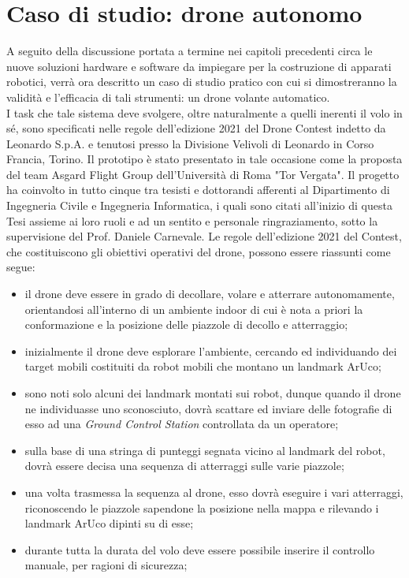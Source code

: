 
\chapter[Caso di studio: drone autonomo]{Caso di studio: drone autonomo}
\label{chap:Chapter3}
\doublespacing
\fontsize{12}{12}\selectfont
\indent A seguito della discussione portata a termine nei capitoli precedenti circa le nuove soluzioni hardware e software da impiegare per la costruzione di apparati robotici, verrà ora descritto un caso di studio pratico con cui si dimostreranno la validità e l'efficacia di tali strumenti: un drone volante automatico.\\
I task che tale sistema deve svolgere, oltre naturalmente a quelli inerenti il volo in sé, sono specificati nelle regole dell'edizione 2021 del Drone Contest indetto da Leonardo S.p.A. e tenutosi presso la Divisione Velivoli di Leonardo in Corso Francia, Torino. Il prototipo è stato presentato in tale occasione come la proposta del team Asgard Flight Group dell'Università di Roma "Tor Vergata". Il progetto ha coinvolto in tutto cinque tra tesisti e dottorandi afferenti al Dipartimento di Ingegneria Civile e Ingegneria Informatica, i quali sono citati all'inizio di questa Tesi assieme ai loro ruoli e ad un sentito e personale ringraziamento, sotto la supervisione del Prof. Daniele Carnevale. Le regole dell'edizione 2021 del Contest, che costituiscono gli obiettivi operativi del drone, possono essere riassunti come segue:
\begin{itemize}
    \item il drone deve essere in grado di decollare, volare e atterrare autonomamente, orientandosi all'interno di un ambiente indoor di cui è nota a priori la conformazione e la posizione delle piazzole di decollo e atterraggio;
    \item inizialmente il drone deve esplorare l'ambiente, cercando ed individuando dei target mobili costituiti da robot mobili che montano un landmark ArUco;
    \item sono noti solo alcuni dei landmark montati sui robot, dunque quando il drone ne individuasse uno sconosciuto, dovrà scattare ed inviare delle fotografie di esso ad una \emph{Ground Control Station} controllata da un operatore;
    \item sulla base di una stringa di punteggi segnata vicino al landmark del robot, dovrà essere decisa una sequenza di atterraggi sulle varie piazzole;
    \item una volta trasmessa la sequenza al drone, esso dovrà eseguire i vari atterraggi, riconoscendo le piazzole sapendone la posizione nella mappa e rilevando i landmark ArUco dipinti su di esse;
    \item durante tutta la durata del volo deve essere possibile inserire il controllo manuale, per ragioni di sicurezza;
\end{itemize}
